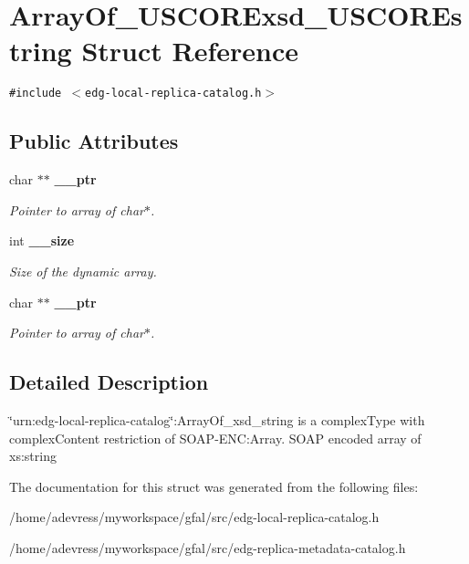 \section{Array\-Of\_\-USCORExsd\_\-USCOREstring Struct Reference}
\label{structArrayOf__USCORExsd__USCOREstring}
{\tt \#include $<$edg-local-replica-catalog.h$>$}

\subsection*{Public Attributes}
\begin{CompactItemize}
\item 
char $\ast$$\ast$ \bf{\_\-\_\-ptr}\label{structArrayOf__USCORExsd__USCOREstring_f36432abc67a9c5b84e7a34c98921f4c}

\begin{CompactList}\small\item\em Pointer to array of char$\ast$. \item\end{CompactList}\item 
int \bf{\_\-\_\-size}\label{structArrayOf__USCORExsd__USCOREstring_776cd355f1d6771e968dfef0ab8378fe}

\begin{CompactList}\small\item\em Size of the dynamic array. \item\end{CompactList}\item 
char $\ast$$\ast$ \bf{\_\-\_\-ptr}\label{structArrayOf__USCORExsd__USCOREstring_f36432abc67a9c5b84e7a34c98921f4c}

\begin{CompactList}\small\item\em Pointer to array of char$\ast$. \item\end{CompactList}\end{CompactItemize}


\subsection{Detailed Description}
\char`\"{}urn:edg-local-replica-catalog\char`\"{}:Array\-Of\_\-xsd\_\-string is a complex\-Type with complex\-Content restriction of SOAP-ENC:Array. SOAP encoded array of xs:string 



The documentation for this struct was generated from the following files:\begin{CompactItemize}
\item 
/home/adevress/myworkspace/gfal/src/edg-local-replica-catalog.h\item 
/home/adevress/myworkspace/gfal/src/edg-replica-metadata-catalog.h\end{CompactItemize}
